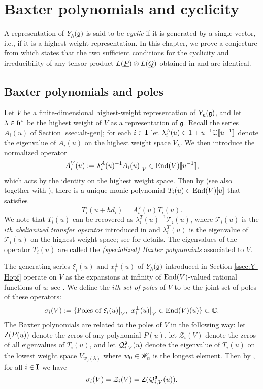 \chapter{Baxter polynomials and cyclicity}

A representation of $Y_\hbar^{}(\mathfrak{g})$ is said to be \emph{cyclic} if it is generated by a single vector, i.e., if it is a highest-weight representation.
In this chapter, we prove a conjecture from \cite[\S 7.4]{gautam_poles_2023} which states that the two sufficient conditions for the cyclicity and irreducibility of any tensor product $L(\underline{P})\otimes L(\underline{Q})$ obtained in \cite{gautam_poles_2023} and \cite{tan_braid_2015} are identical.


\section{Baxter polynomials and poles}\label{sec:baxter-poles}

Let $V$ be a finite-dimensional highest-weight representation of $Y_\hbar^{}(\mathfrak{g})$, and let $\lambda\in\mathfrak{h}^*$ be the highest weight of $V$ as a representation of $\mathfrak{g}$.
Recall the series $A_i(u)$ of Section \ref{ssec:alt-gen}; for each $i\in\mathbf{I}$ let $\lambda_i^A(u)\in 1+u^{-1}\mathbb{C}[\![u^{-1}]\!]$ denote the eigenvalue of $A_i(u)$ on the highest weight space $V_\lambda$.
We then introduce the normalized operator
\[A_i^V(u) := \lambda_i^A(u)^{-1}A_i(u)\big|_V \in\operatorname{End}(V)[\![u^{-1}]\!],\]
which acts by the identity on the highest weight space.
Then by \cite[Thm. 4.4]{gautam_poles_2023} (see also \cite[Cor. 4.7]{gautam_poles_2023} together with \cite[Prop. 5.7, 5.8]{hernandez_shifted_2022}), there is a unique monic polynomial $T_i(u)\in\operatorname{End}(V)[u]$ that satisfies
\begin{equation}\label{eqn:transfer-op}
    T_i(u+\hbar d_i) = A_i^V(u)T_i(u).
\end{equation}
We note that $T_i(u)$ can be recovered as $\lambda_i^T(u)^{-1}\mathscr{T}_i(u)$, where $\mathscr{T}_i(u)$ is the \emph{$i$th abelianized transfer operator} introduced in \cite[\S 4.3]{gautam_poles_2023} and $\lambda_i^T(u)$ is the eigenvalue of $\mathscr{T}_i(u)$ on the highest weight space; see \cite[Remark 5.1]{friesen_braid_2024} for details.
The eigenvalues of the operator $T_i(u)$ are called the \emph{(specialized) Baxter polynomials} associated to $V$.

The generating series $\xi_i(u)$ and $x^\pm_i(u)$ of $Y_\hbar^{}(\mathfrak{g})$ introduced in Section \ref{ssec:Y-Hopf} operate on $V$ as the expansions at infinity of $\operatorname{End}(V)$-valued rational functions of $u$; see \cite[Prop. 3.6]{gautam_yangians_2016}.
We define the \emph{$i$th set of poles} of $V$ to be the joint set of poles of these operators:
\[\sigma_i(V) := \{\text{Poles of } \xi_i(u)\big|_V,\ x^\pm_i(u)\big|_V \in\operatorname{End}(V)(u)\} \subset\mathbb{C}.\]
The Baxter polynomials are related to the poles of $V$ in the following way: let $\mathsf{Z}(P(u))$ denote the zeros of any polynomial $P(u)$, let $\mathcal{Z}_i(V)$ denote the zeros of all eigenvalues of $T_i(u)$, and let $\mathcal{Q}_{i,V}^{\mathfrak{g}}(u)$ denote the eigenvalue of $T_i(u)$ on the lowest weight space $V_{w_0(\lambda)}$ where $w_0\in\mathscr{W}_{\mathfrak{g}}$ is the longest element.
Then by \cite[Thm. 4.4]{gautam_poles_2023}, for all $i\in\mathbf{I}$ we have
\[\sigma_i(V) = \mathcal{Z}_i(V) = \mathsf{Z}(\mathcal{Q}_{i,V}^{\mathfrak{g}}(u)).\]

